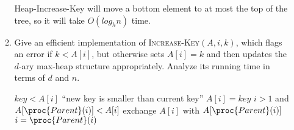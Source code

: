 \documentclass{article}
\begin{document}
\begin{enumerate}
\begin{enumerate}
        Heap-Increase-Key will move a bottom element to at most the top of the 
        tree, so it will take $O(log_h n)$ time.

      \item Give an efficient implementation of
        \textsc{Increase-Key}$(A,i,k)$,
        which flags an error if $k < A[i]$, but otherwise sets $A[i] =
        k$ and then updates the $d$-ary max-heap structure
        appropriately.    Analyze its running time in terms of $d$
        and $n$.
        \begin{codebox}
          \li \If $key < A[i]$ \Do
          \li \Error ``new key is smaller than current key''
        \End
        \li $A[i] = key$
        \li \While $i > 1$ and $A[\proc{Parent}(i)] < A[i]$ \Do
        \li exchange $A[i]$ with $A[\proc{Parent}(i)]$
        \li $i = \proc{Parent}(i)$
        \End
        \end{codebox}

   \end{enumerate}
  \end{enumerate}
  
  
\end{document}
